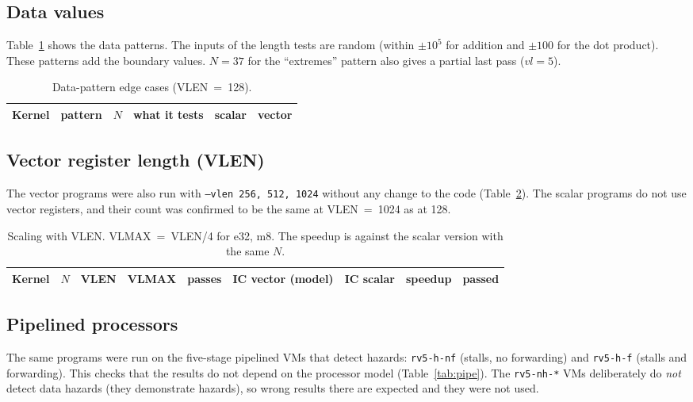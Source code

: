 \documentclass[11pt,a4paper]{article}
\newcommand{\code}[1]{\texttt{#1}}
\begin{document}
\subsection{Data values}

Table~\ref{tab:patterns} shows the data patterns. The inputs of the length tests are random
(within $\pm 10^5$ for addition and $\pm 100$ for the dot product). These patterns add the
boundary values. $N=37$ for the ``extremes'' pattern also gives a partial last pass ($vl=5$).

\begin{table}[H]
\centering\small
\caption{Data-pattern edge cases (VLEN~=~128).}
\label{tab:patterns}
\begin{tabular}{llr>{\raggedright\arraybackslash}p{6.4cm}cc}
\toprule
Kernel & pattern & $N$ & what it tests & scalar & vector \\
\midrule

\bottomrule
\end{tabular}
\end{table}

\subsection{Vector register length (VLEN)}

The vector programs were also run with \code{--vlen 256, 512, 1024} without any change to the
code (Table~\ref{tab:vlen}). The scalar programs do not use vector registers, and their count
was confirmed to be the same at VLEN~=~1024 as at 128.

\begin{table}[H]
\centering\footnotesize\setlength{\tabcolsep}{4.5pt}
\caption{Scaling with VLEN. VLMAX~=~VLEN/4 for e32, m8. The speedup is against the scalar
version with the same $N$.}
\label{tab:vlen}
\begin{tabular}{lrrrrrrrc}
\toprule
Kernel & $N$ & VLEN & VLMAX & passes & IC vector (model) & IC scalar & speedup & passed \\
\midrule

\bottomrule
\end{tabular}
\end{table}

\subsection{Pipelined processors}

The same programs were run on the five-stage pipelined VMs that detect hazards: \code{rv5-h-nf}
(stalls, no forwarding) and \code{rv5-h-f} (stalls and forwarding). This checks that the
results do not depend on the processor model (Table~\ref{tab:pipe}). The \code{rv5-nh-*} VMs
deliberately do \emph{not} detect data hazards (they demonstrate hazards), so wrong results
there are expected and they were not used.
\end{document}
